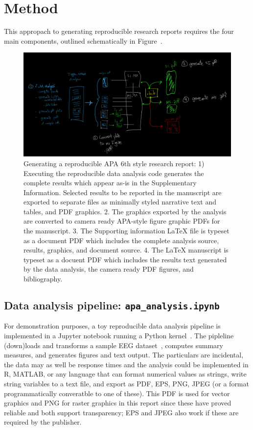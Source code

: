 \documentclass[helv,10pt,man,floatsintext]{apa6}  %
\begin{document}
\section{Method}

This appropach to generating reproducible research reports requires
the four main components, outlined schematically in
Figure~.

\begin{figure}[ht]
\caption{Generating a reproducible APA 6th style research report: 1)
  Executing the reproducible data analysis code generates the complete
  results which appear as-is in the Supplementary
  Information. Selected results to be reported in the manuscript are
  exported to separate files as minimally styled narrative text and
  tables, and PDF graphics. 2. The graphics exported by the analysis
  are converted to camera ready APA-style figure graphic PDFs for the
  manuscript. 3. The Supporting information \LaTeX{} file is typeset
  as a document PDF which includes the complete analysis source,
  results, graphics, and document source. 4. The \LaTeX{} manuscript
  is typeset as a docuent PDF which includes the results text
  generated by the data analysis, the camera ready PDF figures, and
  bibliography.}  
\includegraphics[width=.95\textwidth]{images/report_generation.png}

\end{figure}


\subsection{Data analysis pipeline: \texttt{apa_analysis.ipynb}}

For demonstration purposes, a toy reproducible data analysis pipeline
is implemented in a Jupyter notebook running a Python
kernel~\cite{kluEtAl2016}.  The pipleline (down)loads and
transforms a sample EEG dataset~\cite{Urbach2020z}, computes summary
measures, and generates figures and text output. The particulars are
incidental, the data may as well be response times and the analysis
could be implemented in R, MATLAB, or any language that can format
numerical values as strings, write string variables to a text file,
and export as PDF, EPS, PNG, JPEG (or a format programmatically
converatble to one of these). This PDF is used for vector graphics and
PNG for raster graphics in this report since these have proved
reliable and both support transparency; EPS and JPEG also work if
these are required by the publisher.
\end{document}
